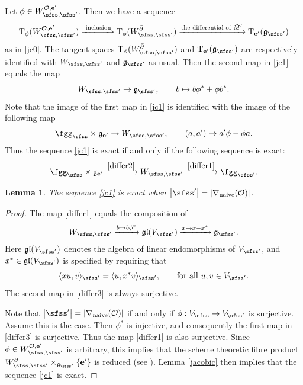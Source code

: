 \documentclass[11pt,a4paper]{amsart}
\def\abs#1{\left|{#1}\right|}
\newcommand{\CO}{{\mathcal {O}}}
\newcommand{\g}{\mathfrak g}
\newcommand{\la}{\langle}
\newcommand{\ra}{\rangle}
\newcommand{\be}{\begin {equation}}
\newcommand{\ee}{\end {equation}}
\numberwithin{equation}{section}
\newtheorem{lem}[thm]{Lemma}
\theoremstyle{remark}
\begin{document}
Let $\phi\in W_{\sfss, \sfss'}^{\CO, \mathbf e'}$. Then we have a sequence
\be\label{jc1}
    \mathrm T_\phi (W_{\sfss, \sfss'}^{\CO, \mathbf e'})\xrightarrow{\textrm{ inclusion}} \mathrm T_\phi(W_{\sfss, \sfss'}^{\bar \partial})\xrightarrow{\textrm{the differential of $\tilde M'$}} \mathrm T_{\mathbf e'}(\g_{\sfss'})
\ee
as in \eqref{jc0}.
The tangent spaces $\mathrm T_\phi(W_{\sfss, \sfss'}^{\bar \partial})$ and $\mathrm T_{\mathbf e'}(\g_{\sfss'})$ are respectively identified with $W_{\sfss, \sfss'}$ and $\g_{\sfss'}$ as usual. Then the second map in \eqref{jc1} equals the map
\be\label{differ1}
  W_{\sfss, \sfss'}\rightarrow \g_{\sfss'}, \qquad b\mapsto b\ww^{*}+\ww b^{*} .
\ee
Note that the  image of the first map in \eqref{jc1} is identified with the image of the following map
\be\label{differ2}
 \fggs\times  \g_{\mathbf e'} \rightarrow W_{\sfss, \sfss'}, \qquad (a,a')\mapsto a'\ww - \ww a.
\ee
Thus the sequence \eqref{jc1} is exact if and only if the following sequence is exact:
\begin{equation}\label{eq:CGG}
  \fggs\times  \g_{\mathbf e'} \xrightarrow{\eqref{differ2} } W_{\sfss, \sfss'}
  \xrightarrow{\eqref{differ1}} \fggsp.
\end{equation}




\begin{lem}\label{lemexact1}
The sequence \eqref{jc1} is exact when $\abs{\sfss'}=\abs{\nabla_{\mathrm{naive}}(\CO)}$.
\end{lem}
\begin{proof}
The map \eqref{differ1} equals the composition of
\be\label{differ3}
  W_{\sfss, \sfss'}\xrightarrow{b\mapsto b\phi^*} \g\mathfrak l(V_{\sfss'})\xrightarrow{x\mapsto x-x^*} \g_{\sfss'}.
\ee
Here $ \g\mathfrak l(V_{\sfss'})$ denotes the algebra of  linear endomorphisms of $V_{\sfss'}$, and $x^*\in  \g\mathfrak l(V_{\sfss'})$ is specified by requiring that
\be\label{ajoint4}
  \la x u, v\ra_{\sfss'}=\la u, x^* v\ra_{\sfss'},\qquad \textrm{for all }u,v\in V_{\sfss'}.
\ee
The second map in \eqref{differ3} is always surjective.

Note that $\abs{\sfss'}=\abs{\nabla_{\mathrm{naive}}(\CO)}$ if and only if  $\phi: V_{\sfss}\rightarrow V_{\sfss'}$ is surjective. Assume this is the case. Then $\phi^*$ is injective, and consequently the first map in  \eqref{differ3}  is  surjective. Thus the map \eqref{differ1} is also surjective. Since $\phi\in W_{\sfss, \sfss'}^{\CO, \mathbf e'}$ is arbitrary, this implies that the scheme theoretic  fibre product
$W_{\sfss, \sfss'}^{\bar \partial}\times_{\g_{\sfss'}}\{\mathbf e'\}$ is reduced (see \cite[Proposition~10.4]{HS}). Lemma \ref{jacobic} then implies that the sequence \eqref{jc1} is exact.
\end{proof}
\end{document}
